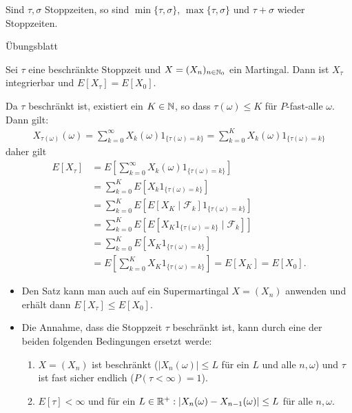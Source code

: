 \documentclass[a4paper,twoside,DIV15,BCOR12mm]{scrbook}
\newcommand{\cF}{\mathcal F}
\begin{document}
\begin{lemma}
Sind $\tau,\sigma$ Stoppzeiten, so sind $\min\{\tau, \sigma\}$, $\max\{\tau, \sigma\}$ und $\tau + \sigma$ wieder Stoppzeiten.
\end{lemma}
\begin{beweis}
Übungsblatt
\end{beweis}

\begin{satz}
Sei $\tau$ eine beschränkte Stoppzeit und $X=(X_n)_{n\in\mathbb{N}_0}$ ein Martingal. Dann ist $X_\tau$ integrierbar und $E[X_\tau] = E[X_0]$.
\end{satz}

\begin{beweis}
Da $\tau$ beschränkt ist, existiert ein $K\in\mathbb{N}$, so dass $\tau(\omega)\le K$ für $P$-fast-alle $\omega$. Dann gilt:
\begin{align*}
X_{\tau(\omega)}(\omega) = \sum_{k=0}^\infty X_k(\omega) 1_{\{\tau(\omega) = k\}} = \sum_{k=0}^K X_k(\omega) 1_{\{\tau(\omega) = k\}} 
\end{align*}
daher gilt
\begin{align*}
E[X_\tau] &= E[\sum_{k=0}^\infty X_k(\omega) 1_{\{\tau(\omega) = k\}}] \\
&= \sum_{k=0}^K E[X_k 1_{\{\tau(\omega) = k\}}] \\
&= \sum_{k=0}^K E[ E[X_K\mid\cF_k]  1_{\{\tau(\omega) = k\}}] \\
&= \sum_{k=0}^K E[ E[X_K 1_{\{\tau(\omega) = k\}}\mid\cF_k] ] \\
&= \sum_{k=0}^K E[X_K 1_{\{\tau(\omega) = k\}} ] \\
&= E[\sum_{k=0}^K X_K 1_{\{\tau(\omega) = k\}} ] = E[X_K] = E [X_0].
\end{align*}
\end{beweis}

\begin{bemerkung}
\begin{itemize}
\item Den Satz kann man auch auf ein Supermartingal $X=(X_n)$ anwenden und erhält dann $E[X_\tau]\leq E[X_0]$.
\item Die Annahme, dass die Stoppzeit $\tau$ beschränkt ist, kann durch eine der beiden folgenden Bedingungen ersetzt werde:
\begin{enumerate}
\item $X=(X_n)$ ist beschränkt ($|X_n(\omega)| \leq L$ für ein $L$ und alle $n, \omega$) und $\tau$ ist fast sicher endlich ($P(\tau < \infty)=1$).
\item $E[\tau]<\infty$ und für ein $L \in \mathbb{R}^+:|X_n(\omega)-X_{n-1}(\omega)|\leq L$ für alle $n,\omega$.
\end{enumerate}
\end{itemize}
\end{bemerkung}
\end{document}
